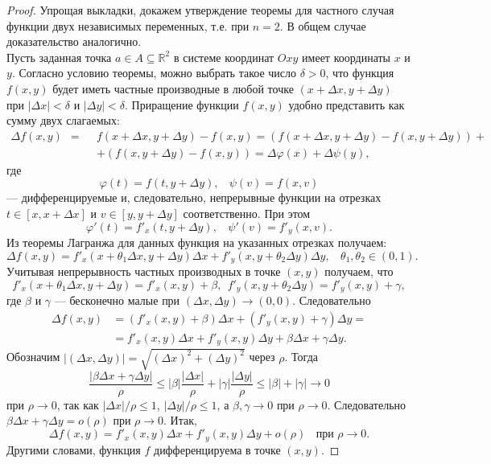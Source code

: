\documentclass[12pt]{report}
\numberwithin{equation}{section}
\begin{document}
\begin{proof}
Упрощая выкладки, докажем утверждение теоремы для частного случая функции двух независимых переменных, т.е. при $n = 2$. В общем случае доказательство аналогично.\\

Пусть заданная точка $a \in A \subseteq \mathbb{R}^2$ в системе координат $Oxy$ имеет координаты $x$ и $y$. Согласно условию теоремы, можно выбрать такое число $\delta > 0$, что функция $f(x,y)$ будет иметь частные производные в любой точке $(x + \Delta x, y + \Delta y)$ при $|\Delta x| < \delta$ и $|\Delta y| < \delta$.  Приращение функции $f(x,y)$ удобно представить как сумму двух слагаемых:
\[ 
\begin{aligned}
\Delta f(x,y)  ~~=~~ &f(x + \Delta x, y + \Delta y) - f(x,y) = (f(x + \Delta x, y + \Delta y) - f(x, y + \Delta y)) +\\
&+(f(x,y + \Delta y) - f(x,y)) = \Delta \varphi(x) + \Delta \psi(y),
\end{aligned}
\]
где
\[ \varphi(t) = f(t, y + \Delta y),~~~~\psi(v) = f(x,v)\]
--- дифференцируемые и, следовательно, непрерывные функции на отрезках $t \in [x, x + \Delta x]$ и $v \in [y, y + \Delta y]$ соответственно. При этом
\[ \varphi'(t) = f'_x(t, y + \Delta y),~~~~\psi'(v) = f'_y(x,v).\]
Из теоремы Лагранжа для данных функция на указанных отрезках получаем:
\[ \Delta f(x,y) = f'_x(x + \theta_1 \Delta x, y + \Delta y)\Delta x + f'_y(x, y + \theta_2 \Delta y) \Delta y,~~~~\theta_1, \theta_2 \in (0,1).\]
Учитывая непрерывность частных производных в точке $(x,y)$ получаем, что
\[ f'_x(x + \theta_1 \Delta x, y + \Delta y) = f'_x(x,y) + \beta,~~f'_y(x, y + \theta_2 \Delta y) = f'_y (x,y) + \gamma, \]
где $\beta$ и $\gamma$ --- бесконечно малые при $(\Delta x, \Delta y) \to (0,0)$. Следовательно
\[ \begin{aligned}
\Delta f(x,y) &= (f'_x(x,y) + \beta)\Delta x + (f'_y(x,y) + \gamma)\Delta y =\\
&= f'_x(x,y)\Delta x + f'_y(x,y)\Delta y + \beta \Delta x + \gamma \Delta y.
\end{aligned}\]
Обозначим $|(\Delta x, \Delta y)| = \sqrt{(\Delta x)^2+(\Delta y)^2}$ через $\rho$. Тогда
\[ \frac{|\beta \Delta x + \gamma \Delta y|}{\rho} \leqslant |\beta| \frac{|\Delta x|}{\rho}  + |\gamma| \frac{|\Delta y|}{\rho} \leqslant |\beta| + |\gamma| \to 0\]
при $\rho \to 0$, так как $|\Delta x | / \rho \leqslant 1$, $|\Delta y| / \rho \leqslant 1$, а $\beta, \gamma \to 0$ при $\rho \to 0$. Следовательно $\beta \Delta x + \gamma \Delta y = o(\rho)$ при $\rho \to 0$. Итак,
\[ \Delta f(x,y) = f'_x (x,y) \Delta x + f'_y (x,y) \Delta y + o(\rho)~~~~\text{при } \rho \to 0.\]
Другими словами, функция $f$ дифференцируема в точке $(x,y)$.
\end{proof}
\end{document}
